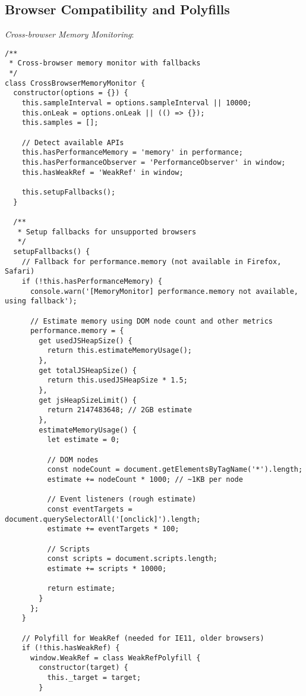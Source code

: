 \documentclass[11pt]{article}
\begin{document}
\subsection{Browser Compatibility and Polyfills}
\label{sec:org78222cc}

\emph{Cross-browser Memory Monitoring}:

\begin{verbatim}
/**
 * Cross-browser memory monitor with fallbacks
 */
class CrossBrowserMemoryMonitor {
  constructor(options = {}) {
    this.sampleInterval = options.sampleInterval || 10000;
    this.onLeak = options.onLeak || (() => {});
    this.samples = [];
    
    // Detect available APIs
    this.hasPerformanceMemory = 'memory' in performance;
    this.hasPerformanceObserver = 'PerformanceObserver' in window;
    this.hasWeakRef = 'WeakRef' in window;
    
    this.setupFallbacks();
  }
  
  /**
   * Setup fallbacks for unsupported browsers
   */
  setupFallbacks() {
    // Fallback for performance.memory (not available in Firefox, Safari)
    if (!this.hasPerformanceMemory) {
      console.warn('[MemoryMonitor] performance.memory not available, using fallback');
      
      // Estimate memory using DOM node count and other metrics
      performance.memory = {
        get usedJSHeapSize() {
          return this.estimateMemoryUsage();
        },
        get totalJSHeapSize() {
          return this.usedJSHeapSize * 1.5;
        },
        get jsHeapSizeLimit() {
          return 2147483648; // 2GB estimate
        },
        estimateMemoryUsage() {
          let estimate = 0;
          
          // DOM nodes
          const nodeCount = document.getElementsByTagName('*').length;
          estimate += nodeCount * 1000; // ~1KB per node
          
          // Event listeners (rough estimate)
          const eventTargets = document.querySelectorAll('[onclick]').length;
          estimate += eventTargets * 100;
          
          // Scripts
          const scripts = document.scripts.length;
          estimate += scripts * 10000;
          
          return estimate;
        }
      };
    }
    
    // Polyfill for WeakRef (needed for IE11, older browsers)
    if (!this.hasWeakRef) {
      window.WeakRef = class WeakRefPolyfill {
        constructor(target) {
          this._target = target;
        }
        

\end{verbatim}
\end{document}
